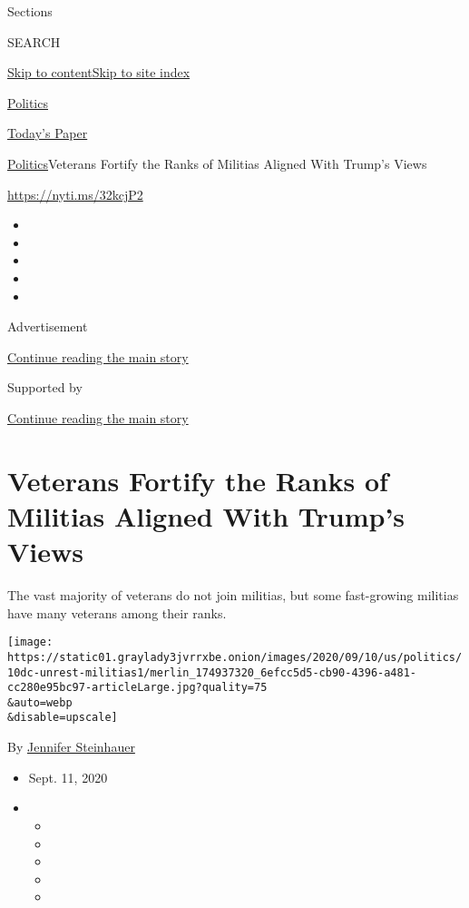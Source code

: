 Sections

SEARCH

\protect\hyperlink{site-content}{Skip to
content}\protect\hyperlink{site-index}{Skip to site index}

\href{https://www.nytimes3xbfgragh.onion/section/politics}{Politics}

\href{https://myaccount.nytimes3xbfgragh.onion/auth/login?response_type=cookie\&client_id=vi}{}

\href{https://www.nytimes3xbfgragh.onion/section/todayspaper}{Today's
Paper}

\href{/section/politics}{Politics}\textbar{}Veterans Fortify the Ranks
of Militias Aligned With Trump's Views

\url{https://nyti.ms/32kcjP2}

\begin{itemize}
\item
\item
\item
\item
\item
\end{itemize}

Advertisement

\protect\hyperlink{after-top}{Continue reading the main story}

Supported by

\protect\hyperlink{after-sponsor}{Continue reading the main story}

\hypertarget{veterans-fortify-the-ranks-of-militias-aligned-with-trumps-views}{%
\section{Veterans Fortify the Ranks of Militias Aligned With Trump's
Views}\label{veterans-fortify-the-ranks-of-militias-aligned-with-trumps-views}}

The vast majority of veterans do not join militias, but some
fast-growing militias have many veterans among their ranks.

\texttt{[image: https://static01.graylady3jvrrxbe.onion/images/2020/09/10/us/politics/10dc-unrest-militias1/merlin\_174937320\_6efcc5d5-cb90-4396-a481-cc280e95bc97-articleLarge.jpg?quality=75\\\&auto=webp\\\&disable=upscale]}

By
\href{https://www.nytimes3xbfgragh.onion/by/jennifer-steinhauer}{Jennifer
Steinhauer}

\begin{itemize}
\item
  Sept. 11, 2020
\item
  \begin{itemize}
  \item
  \item
  \item
  \item
  \item
  \end{itemize}
\end{itemize}

